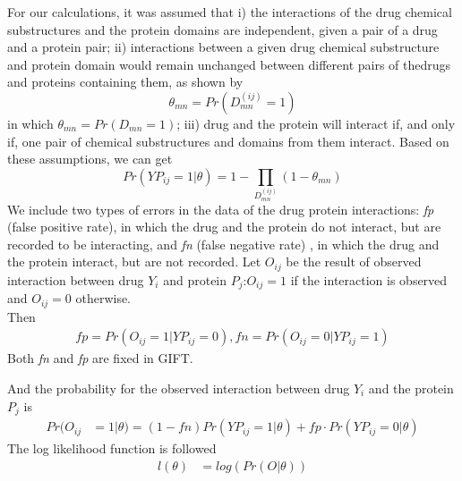 \documentclass[a0,portrait]{a0poster}
\begin{document}
\begin{multicols}{2}
For our calculations, it was assumed that i) the interactions of the drug chemical substructures and the protein domains are independent, given a pair of a drug and a protein pair; ii) interactions between a given drug chemical substructure and protein domain would remain unchanged between different pairs of thedrugs and proteins containing them, as shown by
\begin{equation}
\theta_{mn} = Pr(D_{mn}^{(ij)}=1)
\end{equation}
in which $\theta_{mn} = Pr(D_{mn} = 1)$;
iii) drug and the protein will interact if, and only if, one pair of chemical substructures and domains from them interact. Based on these assumptions, we can get
\begin{equation}
Pr(YP_{ij}=1|\theta)=1-\prod_{D_{mn}^{(ij)}}(1-\theta_{mn})
\end{equation}
We include two types of errors in the data of the drug protein interactions: \textit{fp} (false positive rate), in which the drug and the protein do not interact, but are recorded to be interacting, and \textit{fn} (false negative rate) , in which the drug and the protein interact, but are not recorded. Let $O_{ij}$ be the result of observed interaction between drug $Y_i$ and protein $P_j$:$O_{ij}=1$ if the interaction is observed and $O_{ij}=0$ otherwise.\\Then
\begin{eqnarray}
\textit{fp}=Pr(O_{ij}=1|YP_{ij}=0),
\textit{fn}=Pr(O_{ij}=0|YP_{ij}=1)
\end{eqnarray}
Both \textit{fn} and \textit{fp} are fixed in GIFT.

And the probability for the observed interaction between drug $Y_{i}$ and the protein $P_{j}$ is
\begin{equation}
\begin{aligned}
Pr(O_{ij}&=1|\theta)=(1-\textit{fn})Pr(YP_{ij}=1|\theta)+\textit{fp}\cdot Pr(YP_{ij}=0|\theta)
\end{aligned}
\end{equation}
The log likelihood function is followed
\begin{equation}
\begin{aligned}
l(\theta)&=log(Pr(O|\theta))\\
\end{aligned}
\end{equation}


\end{multicols}
\end{document}
